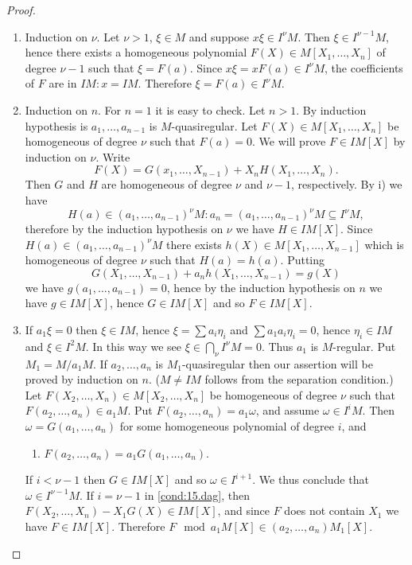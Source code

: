 \documentclass[../main]{subfiles}
\begin{document}
\begin{proof}
\begin{enumerate}
    \item Induction on $\nu$. Let $\nu>1$, $\xi\in M$ and suppose $x\xi\in I^\nu M$. Then $\xi\in I^{\nu-1}M$, hence there exists a homogeneous polynomial $F(X) \in M[X_1,\ldots, X_n]$ of degree $\nu-1$ such that $\xi=F(a)$. Since \newline $x\xi = xF(a) \in I^\nu M$, the coefficients of $F$ are in $IM: x = IM$. Therefore $\xi = F(a) \in I^\nu M$.
    \item Induction on $n$. For $n = 1$ it is easy to check. Let $n>1$. By induction hypothesis is $a_1, \ldots, a_{n-1}$ is $M$-quasiregular. Let $F(X) \in M[X_1, \ldots, X_n]$ be homogeneous of degree $\nu$ such that $F(a)=0$. We will prove $F \in IM[X]$ by induction on $\nu$. Write \[F(X)=G(x_1, \ldots, X_{n-1})+X_n H(X_1, \ldots, X_n).\] Then $G$ and $H$ are homogeneous of degree $\nu$ and $\nu-1$, respectively. By i) we have \[H(a)\in(a_1, \ldots, a_{n-1})^\nu M: a_n=(a_1, \ldots, a_{n-1})^\nu M \subseteq I^\nu M,\] therefore by the induction hypothesis on $\nu$ we have $H \in IM[X]$. Since $H(a) \in(a_1, \ldots, a_{n-1})^\nu M$ there exists $h(X) \in M[X_1, \ldots, X_{n-1}]$ which is homogeneous of degree $\nu$ such that $H(a)=h(a)$. Putting \[G(X_1, \ldots, X_{n-1})+a_nh(X_1, \ldots, X_{n-1})=g(X)\]
    we have $g(a_1, \ldots, a_{n-1})=0$, hence by the induction hypothesis on $n$ we have $g \in IM[X]$, hence $G \in IM[X]$ and so $F \in I M[X]$.
    \item If $a_1 \xi=0$ then $\xi \in I M$, hence $\xi=\sum a_i \eta_i$ and $\sum a_1 a_i \eta_i=0$, hence $\eta_i \in IM$ and $\xi \in I^2 M$. In this way we see $\xi \in\bigcap_\nu I^\nu M=0$. Thus $a_1$ is $M$-regular. Put $M_1=M / a_1 M$. If $a_2,\ldots, a_n$ is $M_1$-quasiregular then our assertion will be proved by induction on $n$. ($M \neq I M$ follows from the separation condition.) Let $F(X_2, \ldots, X_n) \in M[X_2, \ldots, X_n]$ be homogeneous of degree $\nu$ such that $F(a_2, \ldots, a_n) \in a_1M$. Put $F(a_2, \ldots, a_n)=a_1\omega$, and assume $\omega \in I^i M$. Then $\omega=G(a_1, \ldots, a_n)$ for some homogeneous polynomial of degree $i$, and
    \begin{enumerate}[label = (15.$\dagger$)]
       \item $F(a_2, \ldots, a_n)=a_1 G(a_1, \ldots, a_n)$.\label{cond:15.dag}
    \end{enumerate}
    If $i<\nu-1$ then $G \in IM[X]$ and so $\omega \in I^{i+1}$. We thus conclude that $\omega \in I^{\nu-1} M$. If $i=\nu-1$ in \ref{cond:15.dag}, then $F(X_2, \ldots, X_n)-X_1 G(X)\in IM[X]$, and since $F$ does not contain $X_1$ we have $F \in IM[X]$. Therefore $F \mod a_1 M[X] \in(a_2, \ldots, a_n) M_1[X]$.
\end{enumerate}
\end{proof}
\end{document}
